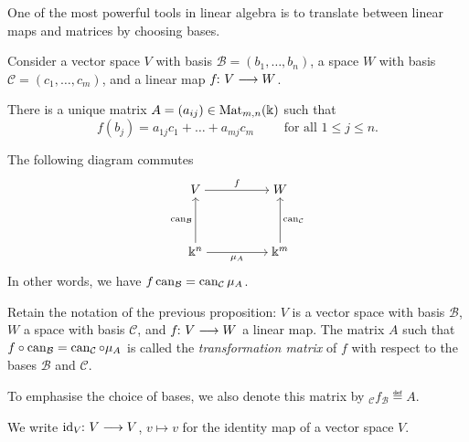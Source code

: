 \documentclass[a4paper, oneside, 12pt]{amsart}
\begin{document}
One of the most powerful tools in linear algebra is to translate between linear maps and matrices by choosing bases.

\begin{proposition}\label{prop:matrices-linear-maps}
  Consider a vector space \(V\) with basis \( \mathcal{B} = (b_{1}, \dots , b_{n})\), a space \(W\) with basis \( \mathcal{C} = (c_{1}, \dots , c_{m})\), and a linear map \(f\from V \to W\).
  \begin{thmlist}
    \item There is a  unique matrix  \(A= (a_{ij}) \in \operatorname{Mat}_{m,n}( \Bbbk)\) such that
    \begin{equation*}
      f(b_{j})= a_{1j}c_{1} + \dots + a_{mj} c_{m}\qquad \text{ for all } 1\leq j \leq n.
    \end{equation*}
    \item The following diagram commutes
    \begin{equation}
      \begin{tikzcd}[ampersand replacement=\&,cramped]
        V \&\& W \\\\
        {\Bbbk^n} \&\& {\Bbbk^m}
        \arrow["f", from=1-1, to=1-3]
        \arrow["{\can_{\mathcal{B}}}", from=3-1, to=1-1]
        \arrow["{\mu_A}"', from=3-1, to=3-3]
        \arrow["{\can_{\mathcal{C}}}"', from=3-3, to=1-3]
      \end{tikzcd}
    \end{equation}
    In other words, we have \(f \operatorname{can}_{ \mathcal{B}} = \operatorname{can}_{\mathcal{C}}\mu_{A}\).
  \end{thmlist}
\end{proposition}

\begin{definition}\label{def:transformation-matrix}
  Retain the notation of the previous proposition: \( V \)  is a vector space with basis \( \mathcal{B} \), \( W \) a space with basis \( \mathcal{C} \), and \( f \from V \to W \) a linear map.
  The matrix \( A \) such that \( f \circ \operatorname{can}_{\mathcal{B}} = \operatorname{can}_{\mathcal{C}} \circ \mu_A \) is called the \emph{transformation matrix} of \( f \) with respect to the bases \( \mathcal{B} \) and \( \mathcal{C} \).

  To emphasise the choice of bases, we also  denote this matrix by \({_{\mathcal{C}}}{f}{_{\mathcal{B}}} \eqdef A\).
\end{definition}

We write \(\id_{V} \from V\to V\), \(v \mapsto v\) for the identity map of a vector space \(V\).
\end{document}
